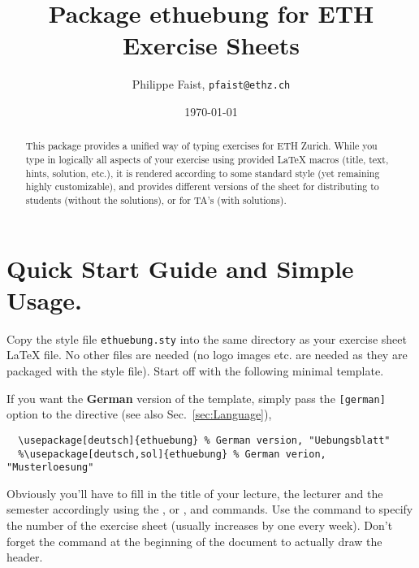 \documentclass[11pt,a4paper]{article}
\title{Package {\fontseries{m}\selectfont ethuebung} for ETH Exercise Sheets}
\author{Philippe Faist, \texttt{pfaist@ethz.ch}}
\date\today
\begin{document}
\maketitle

\renewcommand{\abstractname}{}
\setlength{\noteabstracttextwidth}{0.95\textwidth}
\renewcommand{\noteabstracttextfont}{\small}
\begin{abstract}
This package provides a unified way of typing exercises for ETH Zurich. While you type in
logically all aspects of your exercise using provided \LaTeX{} macros (title, text, hints,
solution, etc.), it is rendered according to some standard style (yet remaining highly
customizable), and provides different versions of the sheet for distributing to students
(without the solutions), or for TA's (with solutions).
\end{abstract}

{\small
\inlinetoc
}

\section{Quick Start Guide and Simple Usage.}
\label{sec:quickstart}

Copy the style file \texttt{ethuebung.sty} into the same directory as your exercise sheet
\LaTeX{} file. No other files are needed (no logo images etc. are needed as they are
packaged with the style file). Start off with the following minimal template.

\begin{pkgverbatim}%
%
\end{pkgverbatim}

If you want the {\bfseries German} version of the template, simply pass the
\texttt{[german]} option to the  directive (see also
Sec.~\ref{sec:Language}),
\begin{pkgverbatim}
\begin{verbatim}
  \usepackage[deutsch]{ethuebung} % German version, "Uebungsblatt"
  %\usepackage[deutsch,sol]{ethuebung} % German verion, "Musterloesung"
\end{verbatim}
\end{pkgverbatim}

Obviously you'll have to fill in the title of your lecture, the lecturer and the semester
accordingly using the ,  or
, and  commands. Use the
 command to specify the number of the exercise sheet (usually
increases by one every week). Don't forget the  command at the
beginning of the document to actually draw the header.
\end{document}
